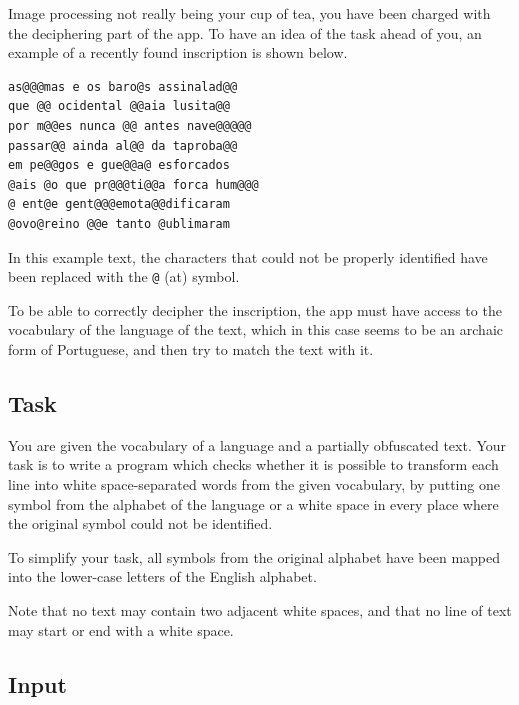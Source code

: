\documentclass[11pt]{report}
\begin{document}
Image processing not really being your cup of tea, you have been
charged with the deciphering part of the app. To have an idea of the
task ahead of you, an example of a recently found inscription is shown
below.
\begin{center}
  \begin{minipage}{.6\linewidth}
\begin{verbatim}
as@@@mas e os baro@s assinalad@@
que @@ ocidental @@aia lusita@@
por m@@es nunca @@ antes nave@@@@@
passar@@ ainda al@@ da taproba@@
em pe@@gos e gue@@a@ esforcados
@ais @o que pr@@@ti@@a forca hum@@@
@ ent@e gent@@@emota@@dificaram
@ovo@reino @@e tanto @ublimaram
\end{verbatim}
  \end{minipage}
\end{center}
In this example text, the characters that could not be properly
identified have been replaced with the \texttt{@} (at) symbol.

To be able to correctly decipher the inscription, the app must have
access to the vocabulary of the language of the text, which in this
case seems to be an archaic form of Portuguese, and then try to match
the text with it.


\subsection*{Task}

You are given the vocabulary of a language and a partially obfuscated
text. Your task is to write a program which checks whether it is
possible to transform each line into white space-separated words from
the given vocabulary, by putting one symbol from the alphabet of the
language or a white space in every place where the original symbol
could not be identified.

To simplify your task, all symbols from the original alphabet have
been mapped into the lower-case letters of the English alphabet.

Note that no text may contain two adjacent white spaces, and that no
line of text may start or end with a white space.


\subsection*{Input}
\end{document}
